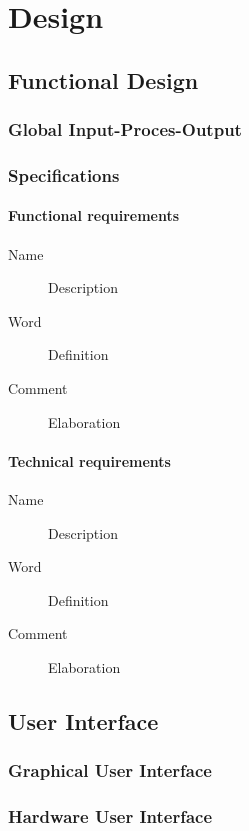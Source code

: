 \documentclass[11pt,fleqn,,a4paper,twoside,openright]{book}
\begin{document}
\newpage
\part{Design}

\chapter{Functional Design}

\section{Global Input-Proces-Output}


\section{Specifications}


\subsection{Functional requirements}
\begin{description}
	\item[Name] Description
	\item[Word] Definition
	\item[Comment] Elaboration
\end{description}
\subsection{Technical requirements}
\begin{description}
\item[Name] Description
\item[Word] Definition
\item[Comment] Elaboration
\end{description}

\chapter{User Interface}

\section{Graphical User Interface}


\section{Hardware User Interface}
\end{document}

